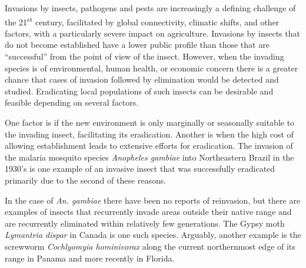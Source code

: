 \documentclass[10pt,a4paper,twocolumn]{article}
\begin{document}
Invasions by insects, pathogens and pests are increasingly a 
defining challenge of the 21\textsuperscript{st} century, 
facilitated by global connectivity, climatic shifts, and
other factors\cite{simberloff_impacts_2013,Pimentel2007}, with a particularly 
severe impact on agriculture\cite{paini2016global}.
Invasions by insects that do not become established have a lower public profile
than those that are ``successful'' from the point of view of the insect.
However, when the invading species is of environmental, human health, or 
economic concern there is a greater chance that cases of invasion followed 
by elimination would be detected 
and studied\cite{liebhold_population_2008}.
Eradicating local populations of such insects can be desirable and 
feasible\cite{myers_eradication_2000} depending on several factors.

One factor is if the new environment is only marginally or 
seasonally suitable to the invading insect, facilitating its eradication.
Another is when the high cost of allowing establishment leads
to extensive efforts for eradication.
The invasion of the malaria mosquito species \textit{Anopheles gambiae}
into Northeastern Brazil in the 1930's\cite{soper_emphanopheles_1943}
is one example of an invasive insect that was successfully eradicated 
primarily due to the second of these
reasons\cite{causey_ecology_1943,killeen_eradication_2002}.

In the case of \textit{An. gambiae} there have been no reports of
reinvasion, but there are examples of insects that
recurrently invade areas outside their native range and are recurrently
eliminated within relatively few generations.
The Gypsy moth \textit{Lymantria dispar} in Canada\cite{gray_hitchhikers_2010} 
is one such species.
Arguably, another example is 
the screwworm \textit{Cochlyomyia hominivorax} along 
the current northernmost edge of its range in 
Panama\cite{robinson_enabling_2009}
and more recently in Florida\cite{matthews2017news}.
\end{document}
